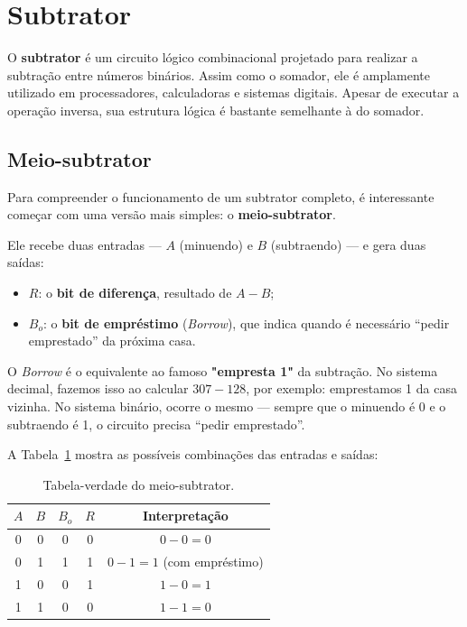 \documentclass[12pt]{article}
\begin{document}
\section{Subtrator}

O \textbf{subtrator} é um circuito lógico combinacional projetado para realizar a subtração entre números binários.  
Assim como o somador, ele é amplamente utilizado em processadores, calculadoras e sistemas digitais.  
Apesar de executar a operação inversa, sua estrutura lógica é bastante semelhante à do somador.

\subsection{Meio-subtrator}

Para compreender o funcionamento de um subtrator completo, é interessante começar com uma versão mais simples: o \textbf{meio-subtrator}.  

Ele recebe duas entradas — \(A\) (minuendo) e \(B\) (subtraendo) — e gera duas saídas:
\begin{itemize}
    \item \(R\): o \textbf{bit de diferença}, resultado de \(A - B\);
    \item \(B_o\): o \textbf{bit de empréstimo} (\textit{Borrow}), que indica quando é necessário “pedir emprestado” da próxima casa.
\end{itemize}

\begin{tcolorbox}[mynote, title=\textbf{\textit{Borrow}}]
O \textit{Borrow} é o equivalente ao famoso \textbf{"empresta 1"} da subtração.  
No sistema decimal, fazemos isso ao calcular $307 - 128$, por exemplo: emprestamos 1 da casa vizinha.  
No sistema binário, ocorre o mesmo — sempre que o minuendo é 0 e o subtraendo é 1, o circuito precisa “pedir emprestado”.
\end{tcolorbox}

A Tabela~\ref{tab:meio-subtrator} mostra as possíveis combinações das entradas e saídas:

\begin{table}[H]
\centering
\begin{tabular}{|c|c|c|c|c|}
\hline
$A$ & $B$ & $B_o$ & $R$ & Interpretação \\
\hline
0 & 0 & 0 & 0 & $0 - 0 = 0$ \\
0 & 1 & 1 & 1 & $0 - 1 = 1$ (com empréstimo) \\
1 & 0 & 0 & 1 & $1 - 0 = 1$ \\
1 & 1 & 0 & 0 & $1 - 1 = 0$ \\
\hline
\end{tabular}
\caption{Tabela-verdade do meio-subtrator.}
\label{tab:meio-subtrator}
\end{table}
\end{document}
